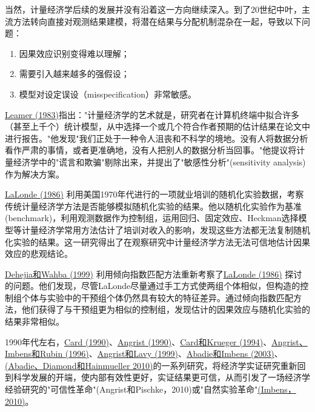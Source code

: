 当然，计量经济学后续的发展并没有沿着这一方向继续深入。到了20世纪中叶，主流方法转向直接对观测结果建模，将潜在结果与分配机制混杂在一起，导致以下问题：

\begin{enumerate}
	\item 因果效应识别变得难以理解；
	\item 需要引入越来越多的强假设；
	\item 模型对设定误设（misspecification）非常敏感。
\end{enumerate}

\href{https://www.jstor.org/stable/1803924}{Leamer (1983)}指出："计量经济学的艺术就是，研究者在计算机终端中拟合许多（甚至上千个）统计模型，从中选择一个或几个符合作者预期的估计结果在论文中进行报告。"他发现"我们正处于一种令人沮丧和不科学的境地。没有人将数据分析看作严肃的事情，或者更准确地，没有人把别人的数据分析当回事。"他提议将计量经济学中的"谎言和欺骗"剔除出来，并提出了"敏感性分析"(sensitivity analysis)作为解决方案。

\href{https://www.jstor.org/stable/1806062}{LaLonde (1986)} 利用美国1970年代进行的一项就业培训的随机化实验数据，考察传统计量经济学方法是否能够模拟随机化实验的结果。他以随机化实验作为基准(benchmark)，利用观测数据作为控制组，运用回归、固定效应、Heckman选择模型等计量经济学常用方法估计了培训对收入的影响，发现这些方法都无法复制随机化实验的结果。这一研究得出了在观察研究中计量经济学方法无法可信地估计因果效应的悲观结论。

\href{https://doi.org/10.1080/01621459.1999.10473858}{Dehejia和Wahba (1999)} 利用倾向指数匹配方法重新考察了\href{https://www.jstor.org/stable/1806062}{LaLonde (1986)} 探讨的问题。他们发现，尽管LaLonde尽量通过手工方式使两组个体相似，但构造的控制组个体与实验中的干预组个体仍然具有较大的特征差异。通过倾向指数匹配方法，他们获得了与干预组更为相似的控制组，发现估计的因果效应与随机化实验的结果非常相似。

1990年代左右，\href{https://doi.org/10.1177/001979399004300205}{Card (1990)}、\href{https://www.jstor.org/stable/2006669}{Angrist (1990)}、\href{https://doi.org/10.3386/w4509}{Card和Krueger (1994)}、\href{https://doi.org/10.1080/01621459.1996.10476902}{Angrist、Imbens和Rubin (1996)}、\href{https://doi.org/10.1162/003355399556061}{Angrist和Lavy (1999)}、\href{https://doi.org/10.3982/ECTA11293}{Abadie和Imbens (2003)}、\href{https://doi.org/10.1198/jasa.2009.ap08746}{(Abadie、Diamond和Hainmueller 2010)}的一系列研究，将经济学实证研究重新回到科学发展的开端，使内部有效性更好，实证结果更可信，从而引发了一场经济学经验研究的"可信性革命"(Angrist和Pischke，2010)或"自然实验革命"\href{https://doi.org/10.1037/a0018538}{(Imbens，2010)}。

